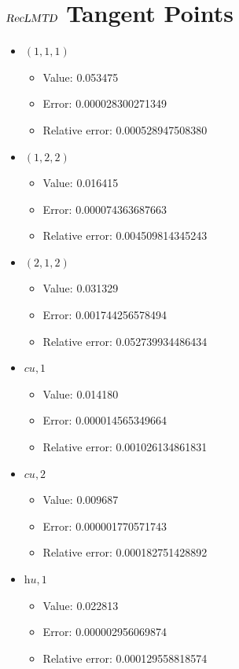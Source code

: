 \documentclass{article}%
\begin{document}
\section{$\textsl{RecLMTD}$ Tangent Points}%
\thispagestyle{plain}%
\begin{itemize}%
	\item $(1, 1, 1)$%
	\begin{itemize}%
		\item Value: 0.053475%
		\item Error: 0.000028300271349%
		\item Relative error: 0.000528947508380%
	\end{itemize}%
	\item $(1, 2, 2)$%
	\begin{itemize}%
		\item Value: 0.016415%
		\item Error: 0.000074363687663%
		\item Relative error: 0.004509814345243%
	\end{itemize}%
	\item $(2, 1, 2)$%
	\begin{itemize}%
		\item Value: 0.031329%
		\item Error: 0.001744256578494%
		\item Relative error: 0.052739934486434%
	\end{itemize}%
	\item $\textit{cu},1$%
	\begin{itemize}%
		\item Value: 0.014180%
		\item Error: 0.000014565349664%
		\item Relative error: 0.001026134861831%
	\end{itemize}%
	\item $\textit{cu},2$%
	\begin{itemize}%
		\item Value: 0.009687%
		\item Error: 0.000001770571743%
		\item Relative error: 0.000182751428892%
	\end{itemize}%
	\item $\textit{hu},1$%
	\begin{itemize}%
		\item Value: 0.022813%
		\item Error: 0.000002956069874%
		\item Relative error: 0.000129558818574%
	\end{itemize}%
\end{itemize}%
\end{document}
